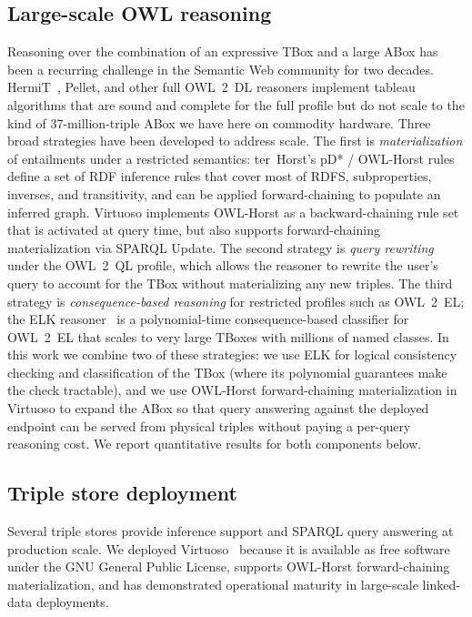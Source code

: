 \documentclass[11pt,a4paper]{article}
\begin{document}
\subsection{Large-scale OWL reasoning}

Reasoning over the combination of an expressive TBox and a
large ABox has been a recurring challenge in the Semantic Web
community for two decades. HermiT~\cite{hermit}, Pellet, and other
full OWL~2~DL reasoners implement tableau algorithms that are sound
and complete for the full profile but do not scale to the kind of
37-million-triple ABox we have here on commodity hardware. Three
broad strategies have been developed to address scale. The first is
\emph{materialization} of entailments under a restricted
semantics: ter~Horst's pD* / OWL-Horst rules~\cite{owlhorst} define a
set of RDF inference rules that cover most of RDFS, subproperties,
inverses, and transitivity, and can be applied forward-chaining to
populate an inferred graph. Virtuoso implements OWL-Horst as a
backward-chaining rule set that is activated at query time, but also
supports forward-chaining materialization via SPARQL Update. The
second strategy is \emph{query rewriting} under the OWL~2~QL profile,
which allows the reasoner to rewrite the user's query to account for
the TBox without materializing any new triples. The third strategy is
\emph{consequence-based reasoning} for restricted profiles such as
OWL~2~EL; the ELK reasoner~\cite{elk} is a polynomial-time
consequence-based classifier for OWL~2~EL that scales to very large
TBoxes with millions of named classes. In this work we combine two
of these strategies: we use ELK for logical consistency checking
and classification of the TBox (where its polynomial guarantees make
the check tractable), and we use OWL-Horst forward-chaining
materialization in Virtuoso to expand the ABox so that query
answering against the deployed endpoint can be served from physical
triples without paying a per-query reasoning cost. We report
quantitative results for both components below.

\subsection{Triple store deployment}

Several triple stores provide inference support and SPARQL query
answering at production scale. We deployed Virtuoso~\cite{virtuoso}
because it is available as free software under the GNU General Public
License, supports OWL-Horst forward-chaining materialization, and has
demonstrated operational maturity in large-scale linked-data
deployments.
\end{document}
